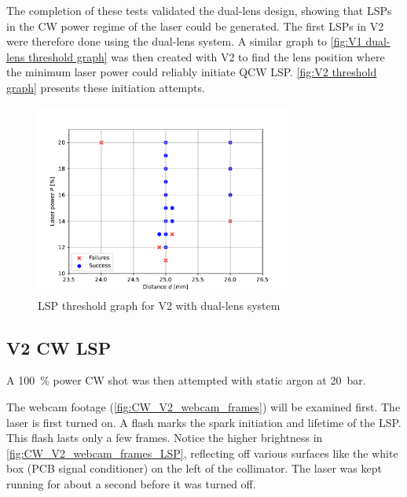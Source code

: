             The completion of these tests validated the dual-lens design, showing that LSPs in the CW power regime of the laser could be generated. The first LSPs in V2 were therefore done using the dual-lens system. A similar graph to \autoref{fig:V1 dual-lens threshold graph} was then created with V2 to find the lens position where the minimum laser power could reliably initiate QCW LSP. \autoref{fig:V2 threshold graph} presents these initiation attempts.
            \begin{figure}[!ht]
                \centering
                \includegraphics[width=0.75\textwidth]{assets/4 experiments/V2_focus_threshold.pdf}
                \caption{LSP threshold graph for V2 with dual-lens system}
                \label{fig:V2 threshold graph}
            \end{figure}

        \subsection{V2 CW LSP}

            A \qty{100}{\%} power CW shot was then attempted with static argon at \qty{20}{bar}. 

            

            The webcam footage (\autoref{fig:CW_V2_webcam_frames}) will be examined first. The laser is first turned on. A flash marks the spark initiation and lifetime of the LSP. This flash lasts only a few frames. Notice the higher brightness in \autoref{fig:CW_V2_webcam_frames_LSP}, reflecting off various surfaces like the white box (PCB signal conditioner) on the left of the collimator. The laser was kept running for about a second before it was turned off.


